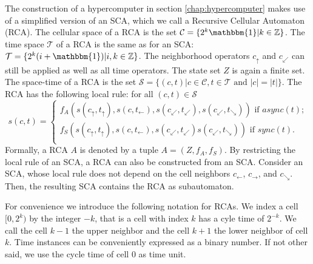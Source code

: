 \documentclass[pre,amssymb,showpacs,showkeys,preprint]{revtex4}
\begin{document}
The construction of a hypercomputer in section \ref{chap:hypercomputer} makes use of a simplified version of an SCA, which we call
a Recursive Cellular Automaton (RCA).
The cellular space of a RCA is the set $\mathcal{C} = \{2^k \mathbbm{1} | k \in \mathbb Z\}$.
The time space $\mathcal{T}$ of a RCA is the same as for an SCA: $\mathcal{T} = \{2^k (i + \mathbbm{1})| i, k \in \mathbb{Z}\}$.
The neighborhood operators $c_\uparrow$ and $c_\swarrow$ can still be applied as well as all time operators.
The state set $Z$ is again a finite set.
The space-time of a RCA is the set $\mathcal{S} = \{(c,t)| c \in \mathcal{C}, t \in \mathcal{T} \mbox{ and } |c| = |t|\}$.
The RCA has the following local rule: for all $(c, t) \in \mathcal{S}$
\begin{equation}
s(c,t) = \left\{
\begin{array}{l}
f_{A}(
        s(c_\uparrow, t_\uparrow),
        s(c, t_\leftarrow),
        s(c_\swarrow, t_\swarrow),
        s(c_\swarrow, t_\searrow)
) \mbox{  if $\mathit{async}(t)$;} \\
f_{S}(
        s(c_\uparrow, t_\uparrow),
        s(c, t_\leftarrow),
        s(c_\swarrow, t_\swarrow)
        s(c_\swarrow, t_\searrow)
) \mbox{  if $\mathit{sync}(t)$.} \\
\end{array}
\right.
\end{equation}
Formally, a RCA $A$ is denoted by a tuple $A = (Z, f_A, f_S)$.
By restricting the local rule of an SCA, a RCA can also be constructed from an SCA.
Consider an SCA, whose local rule does not depend on
the cell neighbors $c_\leftarrow$, $c_\rightarrow$, and $c_\searrow$.
Then, the resulting SCA contains the RCA as subautomaton.

For convenience we introduce the following notation for RCAs.
We index a cell $[0, 2^k)$ by the integer $-k$, that is a cell with index $k$ has a cyle time of $2^{-k}$.
We call the cell $k - 1$ the upper neighbor and the cell $k + 1$ the lower neighbor of cell $k$.
Time instances can be conveniently expressed as a binary number.
If not other said, we use the cycle time of cell 0 as time unit.
\end{document}
